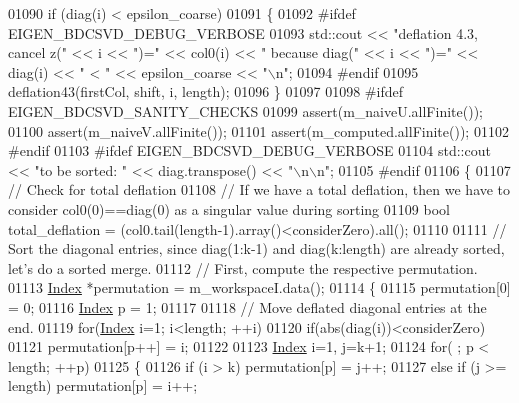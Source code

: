 \begin{DoxyCode}
01090     \textcolor{keywordflow}{if} (diag(i) < epsilon\_coarse)
01091     \{
01092 \textcolor{preprocessor}{#ifdef  EIGEN\_BDCSVD\_DEBUG\_VERBOSE}
01093       std::cout << \textcolor{stringliteral}{"deflation 4.3, cancel z("} << i << \textcolor{stringliteral}{")="} << col0(i) << \textcolor{stringliteral}{" because diag("} << i << \textcolor{stringliteral}{")="} << 
      diag(i) << \textcolor{stringliteral}{" < "} << epsilon\_coarse << \textcolor{stringliteral}{"\(\backslash\)n"};
01094 \textcolor{preprocessor}{#endif}
01095       deflation43(firstCol, shift, i, length);
01096     \}
01097 
01098 \textcolor{preprocessor}{#ifdef EIGEN\_BDCSVD\_SANITY\_CHECKS}
01099   assert(m\_naiveU.allFinite());
01100   assert(m\_naiveV.allFinite());
01101   assert(m\_computed.allFinite());
01102 \textcolor{preprocessor}{#endif}
01103 \textcolor{preprocessor}{#ifdef EIGEN\_BDCSVD\_DEBUG\_VERBOSE}
01104   std::cout << \textcolor{stringliteral}{"to be sorted: "} << diag.transpose() << \textcolor{stringliteral}{"\(\backslash\)n\(\backslash\)n"};
01105 \textcolor{preprocessor}{#endif}
01106   \{
01107     \textcolor{comment}{// Check for total deflation}
01108     \textcolor{comment}{// If we have a total deflation, then we have to consider col0(0)==diag(0) as a singular value during
       sorting}
01109     \textcolor{keywordtype}{bool} total\_deflation = (col0.tail(length-1).array()<considerZero).all();
01110     
01111     \textcolor{comment}{// Sort the diagonal entries, since diag(1:k-1) and diag(k:length) are already sorted, let's do a
       sorted merge.}
01112     \textcolor{comment}{// First, compute the respective permutation.}
01113     \hyperlink{namespace_eigen_a62e77e0933482dafde8fe197d9a2cfde}{Index} *permutation = m\_workspaceI.data();
01114     \{
01115       permutation[0] = 0;
01116       \hyperlink{namespace_eigen_a62e77e0933482dafde8fe197d9a2cfde}{Index} p = 1;
01117       
01118       \textcolor{comment}{// Move deflated diagonal entries at the end.}
01119       \textcolor{keywordflow}{for}(\hyperlink{namespace_eigen_a62e77e0933482dafde8fe197d9a2cfde}{Index} i=1; i<length; ++i)
01120         \textcolor{keywordflow}{if}(abs(diag(i))<considerZero)
01121           permutation[p++] = i;
01122         
01123       \hyperlink{namespace_eigen_a62e77e0933482dafde8fe197d9a2cfde}{Index} i=1, j=k+1;
01124       \textcolor{keywordflow}{for}( ; p < length; ++p)
01125       \{
01126              \textcolor{keywordflow}{if} (i > k)             permutation[p] = j++;
01127         \textcolor{keywordflow}{else} \textcolor{keywordflow}{if} (j >= length)       permutation[p] = i++;

\end{DoxyCode}
